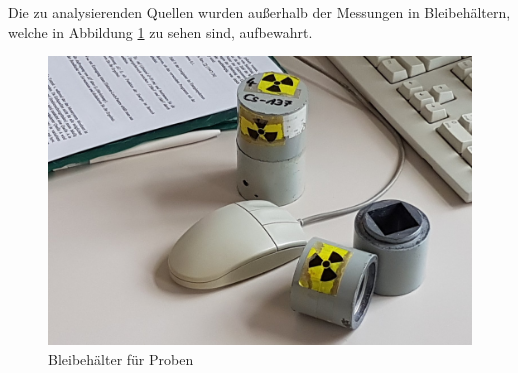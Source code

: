 	Die zu analysierenden Quellen wurden außerhalb der Messungen in Bleibehältern, welche in Abbildung \ref{fig:proben} zu sehen sind, aufbewahrt.

	\begin{figure}[htb]
		\centering
		\includegraphics[scale=0.2]{pic/proben.jpg}
		\caption{Bleibehälter für Proben}
		\label{fig:proben}
	\end{figure}

